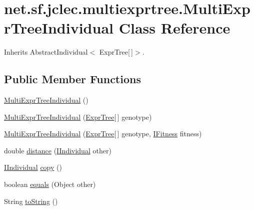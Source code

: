 \hypertarget{classnet_1_1sf_1_1jclec_1_1multiexprtree_1_1_multi_expr_tree_individual}{\section{net.\-sf.\-jclec.\-multiexprtree.\-Multi\-Expr\-Tree\-Individual Class Reference}
\label{classnet_1_1sf_1_1jclec_1_1multiexprtree_1_1_multi_expr_tree_individual}
}


Inherits Abstract\-Individual$<$ Expr\-Tree\mbox{[}$\,$\mbox{]}$>$.

\subsection*{Public Member Functions}
\begin{DoxyCompactItemize}
\item 
\hyperlink{classnet_1_1sf_1_1jclec_1_1multiexprtree_1_1_multi_expr_tree_individual_a2dc9d30db935f2f3c11bf68bd623136b}{Multi\-Expr\-Tree\-Individual} ()
\item 
\hyperlink{classnet_1_1sf_1_1jclec_1_1multiexprtree_1_1_multi_expr_tree_individual_a7c2ac236b982d6cb8a1a6a234c0cea50}{Multi\-Expr\-Tree\-Individual} (\hyperlink{classnet_1_1sf_1_1jclec_1_1exprtree_1_1_expr_tree}{Expr\-Tree}\mbox{[}$\,$\mbox{]} genotype)
\item 
\hyperlink{classnet_1_1sf_1_1jclec_1_1multiexprtree_1_1_multi_expr_tree_individual_ac800e02c44e0565f128b67a057af3543}{Multi\-Expr\-Tree\-Individual} (\hyperlink{classnet_1_1sf_1_1jclec_1_1exprtree_1_1_expr_tree}{Expr\-Tree}\mbox{[}$\,$\mbox{]} genotype, \hyperlink{interfacenet_1_1sf_1_1jclec_1_1_i_fitness}{I\-Fitness} fitness)
\item 
double \hyperlink{classnet_1_1sf_1_1jclec_1_1multiexprtree_1_1_multi_expr_tree_individual_a32a4468143eb7321d751a9cda2965bae}{distance} (\hyperlink{interfacenet_1_1sf_1_1jclec_1_1_i_individual}{I\-Individual} other)
\item 
\hyperlink{interfacenet_1_1sf_1_1jclec_1_1_i_individual}{I\-Individual} \hyperlink{classnet_1_1sf_1_1jclec_1_1multiexprtree_1_1_multi_expr_tree_individual_a2492a465b911f7d4bde3d2965276c95e}{copy} ()
\item 
boolean \hyperlink{classnet_1_1sf_1_1jclec_1_1multiexprtree_1_1_multi_expr_tree_individual_aafb5126bd916378a2336b7766ca692a6}{equals} (Object other)
\item 
String \hyperlink{classnet_1_1sf_1_1jclec_1_1multiexprtree_1_1_multi_expr_tree_individual_ac5750e7714a5345b2ae2af221c867322}{to\-String} ()
\end{DoxyCompactItemize}


